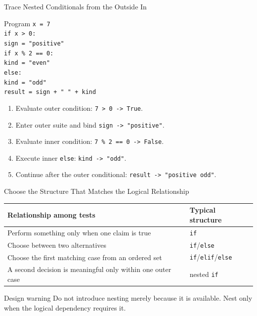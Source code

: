\documentclass[aspectratio=169,10pt]{beamer}
\begin{document}
\begin{frame}{Trace Nested Conditionals from the Outside In}
  \begin{block}{Program}
    \texttt{x = 7}\\
    \texttt{if x > 0:}\\
    \hspace*{0.20in}\texttt{sign = "positive"}\\
    \hspace*{0.20in}\texttt{if x \% 2 == 0:}\\
    \hspace*{0.40in}\texttt{kind = "even"}\\
    \hspace*{0.20in}\texttt{else:}\\
    \hspace*{0.40in}\texttt{kind = "odd"}\\
    \texttt{result = sign + " " + kind}
  \end{block}

  \begin{enumerate}
    \item Evaluate outer condition: \texttt{7 > 0 -> True}.
    \item Enter outer suite and bind \texttt{sign -> "positive"}.
    \item Evaluate inner condition: \texttt{7 \% 2 == 0 -> False}.
    \item Execute inner \texttt{else}: \texttt{kind -> "odd"}.
    \item Continue after the outer conditional: \texttt{result -> "positive odd"}.
  \end{enumerate}
\end{frame}

\begin{frame}{Choose the Structure That Matches the Logical Relationship}
  \begin{center}
    \renewcommand{\arraystretch}{1.30}
    \begin{tabular}{l|l}
      \textbf{Relationship among tests} & \textbf{Typical structure} \\\hline
      Perform something only when one claim is true & \texttt{if} \\
      Choose between two alternatives & \texttt{if}/\texttt{else} \\
      Choose the first matching case from an ordered set & \texttt{if}/\texttt{elif}/\texttt{else} \\
      A second decision is meaningful only within one outer case & nested \texttt{if}
    \end{tabular}
  \end{center}

  \begin{alertblock}{Design warning}
    Do not introduce nesting merely because it is available. Nest only when the logical dependency requires it.
  \end{alertblock}
\end{frame}
\end{document}
